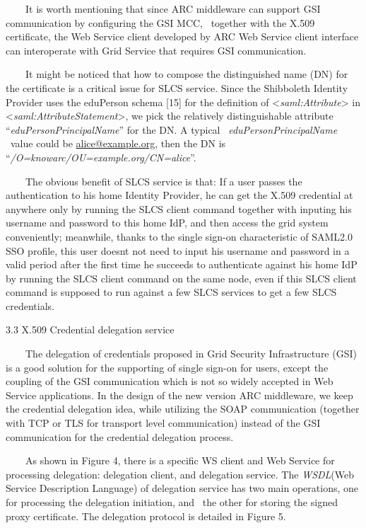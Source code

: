 \documentclass{article}
\begin{document}
\ \ \ \ It is worth mentioning that since ARC middleware can support GSI
communication by configuring the GSI MCC, \ together with the X.509
certificate, the Web Service client developed by ARC Web Service client
interface can interoperate with Grid Service that requires GSI
communication.

\ \ \ \ It might be noticed that how to compose the distinguished name
(DN) for the certificate is a critical issue for SLCS service. Since
the Shibboleth Identity Provider uses the eduPerson schema [15] for the
definition of {\textless}\textit{saml:Attribute}{\textgreater} in
{\textless}\textit{saml:AttributeStatement}{\textgreater}, we pick the
relatively distinguishable attribute
{\textquotedblleft}\textit{eduPersonPrincipalName}{\textquotedblright}
for the DN. A typical \ \textit{eduPersonPrincipalName} \ value could
be \href{mailto:alice@example.org}{alice@example.org}, then the DN is
{\textquotedblleft}\textit{/O=knowarc/OU=example.org/CN=alice}{\textquotedblright}.

\ \ \ \ The obvious benefit of SLCS service is that: If a user passes
the authentication to his home Identity Provider, he can get the X.509
credential at anywhere only by running the SLCS client command together
with inputing his username and password to this home IdP, and then
access the grid system conveniently; meanwhile, thanks to the single
sign-on characteristic of SAML2.0 SSO profile, this user
doesn{\textquotesingle}t not need to input his username and password in
a valid period after the first time he succeeds to authenticate against
his home IdP by running the SLCS client command on the same node, even
if this SLCS client command is supposed to run against a few SLCS
services to get a few SLCS credentials.


\bigskip

3.3 X.509 Credential delegation service

\ \ \ \ The delegation of credentials proposed in Grid Security
Infrastructure (GSI) is a good solution for the supporting of single
sign-on for users, except the coupling of the GSI communication which
is not so widely accepted in Web Service applications. In the design of
the new version ARC middleware, we keep the credential delegation idea,
while utilizing the SOAP communication (together with TCP or TLS for
transport level communication) instead of the GSI communication for the
credential delegation process.

\ \ \ \ As shown in Figure 4, there is a specific WS client and Web
Service for processing delegation: delegation client, and delegation
service. The \textit{WSDL}(Web Service Description Language) of
delegation service has two main operations, one for processing the
delegation initiation, and \ the other for storing the signed proxy
certificate. The delegation protocol is detailed in Figure 5.
\end{document}

